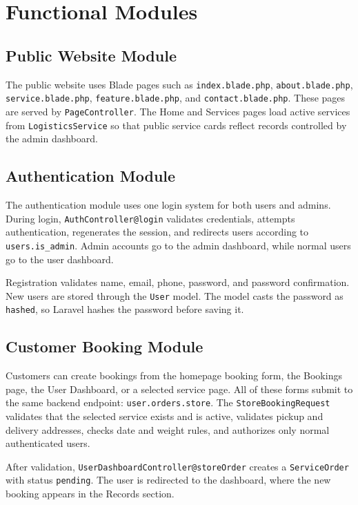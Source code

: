 \documentclass[12pt,a4paper]{report}
\begin{document}
\chapter{Functional Modules}

\section{Public Website Module}

The public website uses Blade pages such as \texttt{index.blade.php}, \texttt{about.blade.php}, \texttt{service.blade.php}, \texttt{feature.blade.php}, and \texttt{contact.blade.php}. These pages are served by \texttt{PageController}. The Home and Services pages load active services from \texttt{LogisticsService} so that public service cards reflect records controlled by the admin dashboard.

\section{Authentication Module}

The authentication module uses one login system for both users and admins. During login, \texttt{AuthController@login} validates credentials, attempts authentication, regenerates the session, and redirects users according to \texttt{users.is\_admin}. Admin accounts go to the admin dashboard, while normal users go to the user dashboard.

Registration validates name, email, phone, password, and password confirmation. New users are stored through the \texttt{User} model. The model casts the password as \texttt{hashed}, so Laravel hashes the password before saving it.

\section{Customer Booking Module}

Customers can create bookings from the homepage booking form, the Bookings page, the User Dashboard, or a selected service page. All of these forms submit to the same backend endpoint: \texttt{user.orders.store}. The \texttt{StoreBookingRequest} validates that the selected service exists and is active, validates pickup and delivery addresses, checks date and weight rules, and authorizes only normal authenticated users.

After validation, \texttt{UserDashboardController@storeOrder} creates a \texttt{ServiceOrder} with status \texttt{pending}. The user is redirected to the dashboard, where the new booking appears in the Records section.
\end{document}

